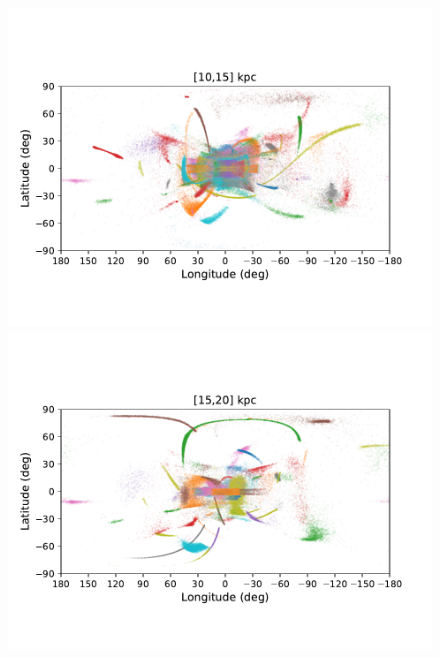     \twocolumn
    \begin{figure}[h!]
        \begin{center}
            \includegraphics[clip=true, trim = 0mm 15mm 0mm 20mm, width=0.9\columnwidth]{images/PII_ensemble_LB_D10-15_scatter.pdf}
            \includegraphics[clip=true, trim = 0mm 15mm 0mm 20mm, width=0.9\columnwidth]{images/PII_ensemble_LB_D15-20_scatter.pdf}


\end{center}
\end{figure}
